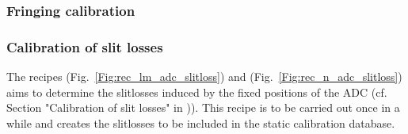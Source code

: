 \subsubsection{Fringing calibration}

\subsubsection{Calibration of slit losses}\label{sssec:adc_slitlosses}
The recipes \hyperref[rec:metis_lm_adc_slitloss]{} (Fig.~\ref{Fig:rec_lm_adc_slitloss}) and \hyperref[rec:metis_n_adc_slitloss]{} (Fig.~\ref{Fig:rec_n_adc_slitloss}) aims to determine the slitlosses induced by the fixed positions of the \ac{ADC} (cf. Section "Calibration of slit losses" in  \cite{METIS-calibration_plan})). This recipe is to be carried out once in a while and creates the slitlosses to be included in the static calibration database.
